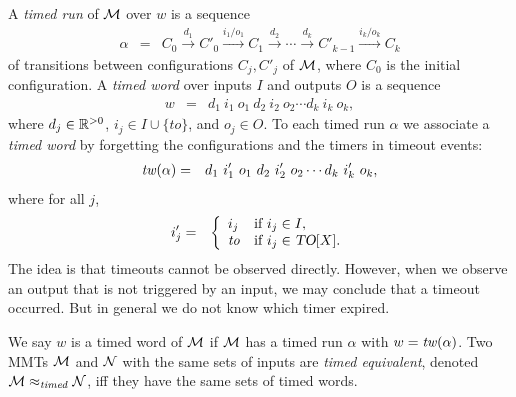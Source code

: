A \emph{timed run} of ${\mathcal M}$ over $w$ is a sequence 
\begin{eqnarray*}
\alpha & = & C_0 \xrightarrow{d_1} C'_0 \xrightarrow{i_1/o_1} C_1 \xrightarrow{d_2} 
\cdots
\xrightarrow{d_k} C'_{k-1} \xrightarrow{i_k/o_k} C_{k}
\end{eqnarray*}
of transitions between configurations $C_j, C'_j$ of ${\mathcal M}$, where $C_0$ is the initial configuration.
A \emph{timed word} over inputs $I$ and outputs $O$ is a sequence
\begin{eqnarray*}
w & = &  d_1 ~ i_1 ~ o_1 ~ d_2 ~ i_2 ~ o_2 \cdots d_k ~ i_k ~ o_k,
\end{eqnarray*}
where $d_j \in {\mathbb R}^{> 0}$, $i_j \in I \cup \{ \mathit{to} \}$, and $o_j \in O$.
To each timed run $\alpha$ we associate a \emph{timed word} by forgetting the configurations and the timers
in timeout events:
\begin{eqnarray*}
\mathit{tw}(\alpha) & = & d_1 ~ i'_1 ~ o_1 ~ d_2 ~ i'_2 ~ o_2 \cdots d_k ~ i'_k ~ o_k,
\end{eqnarray*}
where for all  $j$,
\begin{eqnarray*}
i'_j  & = &   \left\{ \begin{array}{ll}
i_j & \mbox{if } i_j \in I,\\
\mathit{to} & \mbox{if } i_j \in \mbox{\sl TO}[X].
\end{array} \right.
\end{eqnarray*}
The idea is that timeouts cannot be observed directly. 
However, when we observe an output that is not triggered by an input, we may
conclude that a timeout occurred. But in general we do not know which timer expired.

We say $w$ is a timed word of ${\mathcal M}$ if ${\mathcal M}$ has a timed run $\alpha$ with $w = \mathit{tw}(\alpha)$.
%
Two MMTs ${\mathcal M}$ and ${\mathcal N}$ with the same sets of inputs are \emph{timed equivalent}, denoted ${\mathcal M} \approx_{\mathit{timed}} {\mathcal N}$, iff 
they have the same sets of timed words.
\ifshort

\else
